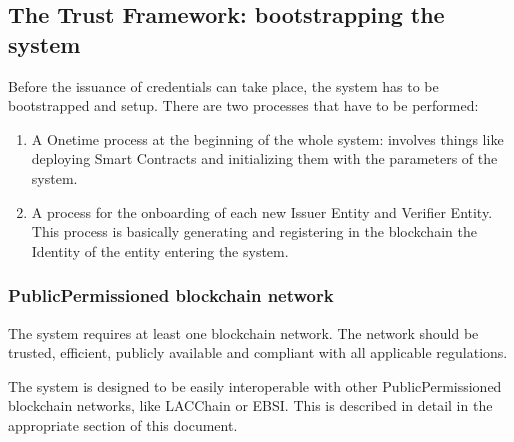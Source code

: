 \documentclass[a4paper,12pt,english]{sphinxhowto}
\begin{document}
\subsection{The Trust Framework: bootstrapping the system}
\label{\detokenize{ssi/privacycred:the-trust-framework-bootstrapping-the-system}}
\sphinxAtStartPar
Before the issuance of credentials can take place, the system has to be bootstrapped and setup. There are two processes that have to be performed:
\begin{enumerate}
%
\item {} 
\sphinxAtStartPar
A One\sphinxhyphen{}time process at the beginning of the whole system: involves things like deploying Smart Contracts and initializing them with the parameters of the system.

\item {} 
\sphinxAtStartPar
A process for the onboarding of each new Issuer Entity and Verifier Entity. This process is basically generating and registering in the blockchain the Identity of the entity entering the system.

\end{enumerate}


\subsubsection{Public\sphinxhyphen{}Permissioned blockchain network}
\label{\detokenize{ssi/privacycred:public-permissioned-blockchain-network}}
\sphinxAtStartPar
The system requires at least one  blockchain network. The network should be trusted, efficient, publicly available and compliant with all applicable regulations.

\sphinxAtStartPar
The system is designed to be easily interoperable with other Public\sphinxhyphen{}Permissioned blockchain networks, like LACChain or EBSI. This is described in detail in the appropriate section of this document.
\end{document}
